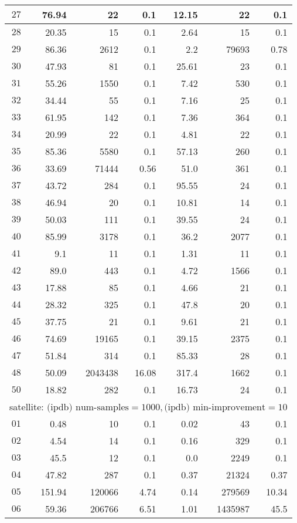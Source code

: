 \begin{longtable}{|c||r|r|r||r|r|r|}
$27$ & 76.94 & 22 & 0.1 &12.15 & 22 & 0.1 \\\hline
$28$ & 20.35 & 15 & 0.1 &2.64 & 15 & 0.1 \\\hline
$29$ & 86.36 & 2612 & 0.1 &2.2 & 79693 & 0.78 \\\hline
$30$ & 47.93 & 81 & 0.1 &25.61 & 23 & 0.1 \\\hline
$31$ & 55.26 & 1550 & 0.1 &7.42 & 530 & 0.1 \\\hline
$32$ & 34.44 & 55 & 0.1 &7.16 & 25 & 0.1 \\\hline
$33$ & 61.95 & 142 & 0.1 &7.36 & 364 & 0.1 \\\hline
$34$ & 20.99 & 22 & 0.1 &4.81 & 22 & 0.1 \\\hline
$35$ & 85.36 & 5580 & 0.1 &57.13 & 260 & 0.1 \\\hline
$36$ & 33.69 & 71444 & 0.56 &51.0 & 361 & 0.1 \\\hline
$37$ & 43.72 & 284 & 0.1 &95.55 & 24 & 0.1 \\\hline
$38$ & 46.94 & 20 & 0.1 &10.81 & 14 & 0.1 \\\hline
$39$ & 50.03 & 111 & 0.1 &39.55 & 24 & 0.1 \\\hline
$40$ & 85.99 & 3178 & 0.1 &36.2 & 2077 & 0.1 \\\hline
$41$ & 9.1 & 11 & 0.1 &1.31 & 11 & 0.1 \\\hline
$42$ & 89.0 & 443 & 0.1 &4.72 & 1566 & 0.1 \\\hline
$43$ & 17.88 & 85 & 0.1 &4.66 & 21 & 0.1 \\\hline
$44$ & 28.32 & 325 & 0.1 &47.8 & 20 & 0.1 \\\hline
$45$ & 37.75 & 21 & 0.1 &9.61 & 21 & 0.1 \\\hline
$46$ & 74.69 & 19165 & 0.1 &39.15 & 2375 & 0.1 \\\hline
$47$ & 51.84 & 314 & 0.1 &85.33 & 28 & 0.1 \\\hline
$48$ & 50.09 & 2043438 & 16.08 &317.4 & 1662 & 0.1 \\\hline
$50$ & 18.82 & 282 & 0.1 &16.73 & 24 & 0.1 \\\hline

\multicolumn{7}{|l|}{satellite: $\text{(ipdb) num-samples}=1000,\text{(ipdb) min-improvement}=10$}\\\hline
$01$ & 0.48 & 10 & 0.1 &0.02 & 43 & 0.1 \\\hline
$02$ & 4.54 & 14 & 0.1 &0.16 & 329 & 0.1 \\\hline
$03$ & 45.5 & 12 & 0.1 &0.0 & 2249 & 0.1 \\\hline
$04$ & 47.82 & 287 & 0.1 &0.37 & 21324 & 0.37 \\\hline
$05$ & 151.94 & 120066 & 4.74 &0.14 & 279569 & 10.34 \\\hline
$06$ & 59.36 & 206766 & 6.51 &1.01 & 1435987 & 45.5 \\\hline


\end{longtable}
